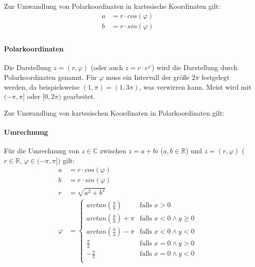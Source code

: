 					Zur Umwandlung von Polarkoordinaten in kartesische Koordinaten gilt:
					\begin{align*}
						a & = r \cdot cos(\varphi) \\
						b & = r \cdot sin(\varphi) \\
					\end{align*}

				\paragraph{Polarkoordinaten}
					Die Darstellung $ z = (r, \varphi) $ (oder auch $ z = r \cdot e ^ \varphi $) wird die Darstellung durch Polarkoordinaten genannt. Für $ \varphi $ muss ein Intervall der größe $ 2\pi $ festgelegt werden, da beispielsweise $ (1, \pi) = (1, 3\pi) $, was verwirren kann. Meist wird mit $ (-\pi, \pi] $ oder $ [0, 2\pi) $ gearbeitet.

					Zur Umwandlung von kartesischen Koordinaten in Polarkoordinaten gilt:

				\paragraph{Umrechnung}
					Für die Umrechnung von $ z \in \mathbb{C} $ zwischen $ z = a + bi $ ($ a, b \in \mathbb{R} $) und $ z = (r, \varphi) $ ($ r \in \mathbb{R} $, $ \varphi \in (-\pi, \pi] $) gilt:
					\begin{align*}
						a       & = r \cdot cos(\varphi) \\
						b       & = r \cdot sin(\varphi) \\
						r       & = \sqrt{a ^ 2 + b ^ 2} \\
						\varphi & =
						\begin{cases}
							arctan(\frac{b}{a})       & \text{falls } x > 0                \\
							arctan(\frac{b}{a}) + \pi & \text{falls } x < 0 \land y \geq 0 \\
							arctan(\frac{b}{a}) - \pi & \text{falls } x < 0 \land y < 0    \\
							\frac{\pi}{2}             & \text{falls } x = 0 \land y > 0    \\
							-\frac{\pi}{2}            & \text{falls } x = 0 \land y < 0    \\
						\end{cases}
					\end{align*}
